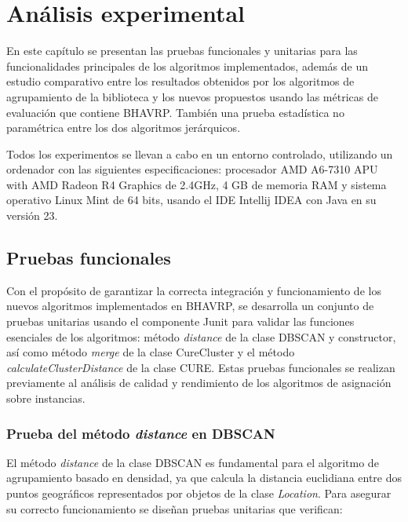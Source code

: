 \chapter{An\'alisis experimental}

En este cap\'itulo se presentan las pruebas funcionales y unitarias para las funcionalidades principales de los algoritmos implementados, adem\'as de un estudio comparativo entre los resultados obtenidos por los algoritmos de agrupamiento de la biblioteca y los nuevos propuestos usando las m\'etricas de evaluaci\'on que contiene BHAVRP. Tambi\'en una prueba estad\'istica no param\'etrica entre los dos algoritmos jer\'arquicos.

Todos los experimentos se llevan a cabo en un entorno controlado, utilizando un ordenador con las siguientes especificaciones: procesador AMD A6-7310 APU with AMD Radeon R4 Graphics de 2.4GHz, 4 GB de memoria RAM y sistema operativo Linux Mint de 64 bits, usando el IDE Intellij IDEA con Java en su versi\'on 23.

\section{Pruebas funcionales}

Con el prop\'osito de garantizar la correcta integraci\'on y funcionamiento de los nuevos algoritmos implementados en BHAVRP, se desarrolla un conjunto de pruebas unitarias usando el componente Junit para validar las funciones esenciales de los algoritmos: m\'etodo \textit{distance} de la clase DBSCAN y constructor, as\'i como m\'etodo \textit{merge} de la clase CureCluster y el m\'etodo \textit{calculateClusterDistance} de la clase CURE. Estas pruebas funcionales se realizan previamente al an\'alisis de calidad y rendimiento de los algoritmos de asignaci\'on sobre instancias.

\subsection{Prueba del m\'etodo \textit{distance} en DBSCAN}

El m\'etodo \textit{distance} de la clase DBSCAN es fundamental para el algoritmo de agrupamiento basado en densidad, ya que calcula la distancia euclidiana entre dos puntos geogr\'aficos representados por objetos de la clase \textit{Location}. Para asegurar su correcto funcionamiento se dise\~nan pruebas unitarias que verifican:

